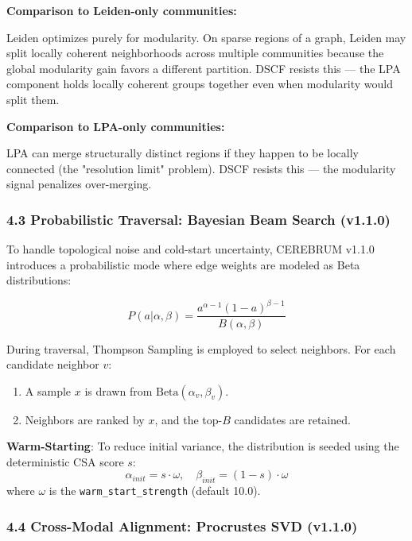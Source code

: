 \documentclass[10pt,journal,compsoc]{IEEEtran}
\begin{document}
\textbf{Comparison to Leiden-only communities:}

Leiden optimizes purely for modularity. On sparse regions of a graph, Leiden
may split locally coherent neigh\-borhoods across multiple communities because
the global modularity gain favors a different partition. DSCF resists this —
the LPA component holds locally coherent groups together even when modularity
would split them.

\textbf{Comparison to LPA-only communities:}

LPA can merge struc\-turally distinct regions if they happen to be locally
connected (the "resolution limit" problem). DSCF resists this — the
modularity signal penalizes over-merging.

\subsubsection{4.3 Probab\-ilistic Traversal: Bayesian Beam Search (v1.1.0)}

To handle topological noise and cold-start uncertainty, CEREBRUM v1.1.0 introduces a proba\-bilistic mode where edge weights are modeled as Beta distr\-ibutions:

\begin{equation}
P(a | \alpha, \beta) = \frac{a^{\alpha-1} (1-a)^{\beta-1}}{B(\alpha, \beta)}
\end{equation}

During traversal, Thompson Sampling is employed to select neighbors. For each candidate neighbor $v$:
\begin{enumerate}
\item A sample $x$ is drawn from $\text{Beta}(\alpha_v, \beta_v)$.
\item Neighbors are ranked by $x$, and the top-$B$ candidates are retained.

\end{enumerate}
\textbf{Warm-Starting}: To reduce initial variance, the distr\-ibution is seeded using the deter\-ministic CSA score $s$:
\begin{equation}
\alpha_{init} = s \cdot \omega, \quad \beta_{init} = (1-s) \cdot \omega
\end{equation}
where $\omega$ is the \texttt{warm\_start\_strength} (default 10.0).

\subsubsection{4.4 Cross-Modal Alignment: Procrustes SVD (v1.1.0)}
\end{document}
